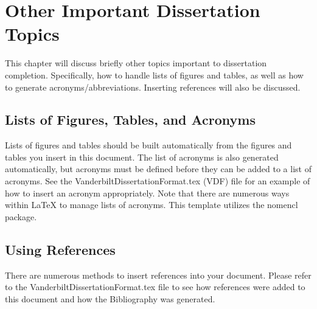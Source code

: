 \chapter{Other Important Dissertation Topics}
This chapter will discuss briefly other topics important to dissertation completion. Specifically, how to handle lists of figures and tables, as well as how to generate acronyms/abbreviations. Inserting references will also be discussed.

\section{ Lists of Figures, Tables, and Acronyms}
Lists of figures and tables should be built automatically from the figures and tables you insert in this document. The list of acronyms is also generated automatically, but acronyms must be defined before they can be added to a list of acronyms. See the  VanderbiltDissertationFormat.tex (VDF) file for an example of how to insert an acronym appropriately. Note that there are numerous ways within LaTeX to manage lists of acronyms. This template utilizes the nomencl package.

\section{Using References}
There are numerous methods to insert references into your document. Please refer to the VanderbiltDissertationFormat.tex file to see how references were added to this document and how the Bibliography was generated.